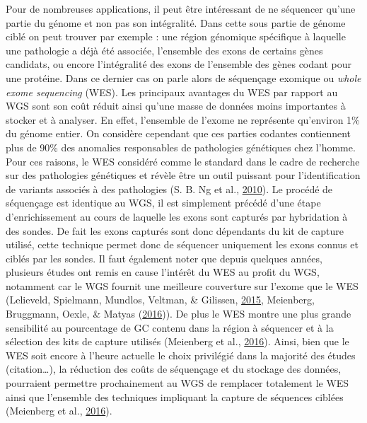 \documentclass[12pt,twoside]{reedthesis}
\theoremstyle{definition}
\theoremstyle{definition}
\theoremstyle{remark}
\begin{document}
  Pour de nombreuses applications, il peut être intéressant de ne
  séquencer qu'une partie du génome et non pas son intégralité. Dans cette
  sous partie de génome ciblé on peut trouver par exemple : une région
  génomique spécifique à laquelle une pathologie a déjà été associée,
  l'ensemble des exons de certains gènes candidats, ou encore
  l'intégralité des exons de l'ensemble des gènes codant pour une
  protéine. Dans ce dernier cas on parle alors de séquençage exomique ou
  \emph{whole exome sequencing} (WES). Les principaux avantages du WES par
  rapport au WGS sont son coût réduit ainsi qu'une masse de données moins
  importantes à stocker et à analyser. En effet, l'ensemble de l'exome ne
  représente qu'environ 1\% du génome entier. On considère cependant que
  ces parties codantes contiennent plus de 90\% des anomalies responsables
  de pathologies génétiques chez l'homme. Pour ces raisons, le WES
  considéré comme le standard dans le cadre de recherche sur des
  pathologies génétiques et révèle être un outil puissant pour
  l'identification de variants associés à des pathologies (S. B. Ng et
  al., \protect\hyperlink{ref-Ng2010}{2010}). Le procédé de séquençage est
  identique au WGS, il est simplement précédé d'une étape d'enrichissement
  au cours de laquelle les exons sont capturés par hybridation à des
  sondes. De fait les exons capturés sont donc dépendants du kit de
  capture utilisé, cette technique permet donc de séquencer uniquement les
  exons connus et ciblés par les sondes. Il faut également noter que
  depuis quelques années, plusieurs études ont remis en cause l'intérêt du
  WES au profit du WGS, notamment car le WGS fournit une meilleure
  couverture sur l'exome que le WES (Lelieveld, Spielmann, Mundlos,
  Veltman, \& Gilissen, \protect\hyperlink{ref-Lelieveld2015}{2015},
  Meienberg, Bruggmann, Oexle, \& Matyas
  (\protect\hyperlink{ref-Meienberg2016}{2016})). De plus le WES montre
  une plus grande sensibilité au pourcentage de GC contenu dans la région
  à séquencer et à la sélection des kits de capture utilisés (Meienberg et
  al., \protect\hyperlink{ref-Meienberg2016}{2016}). Ainsi, bien que le
  WES soit encore à l'heure actuelle le choix privilégié dans la majorité
  des études (citation\ldots{}), la réduction des coûts de séquençage et
  du stockage des données, pourraient permettre prochainement au WGS de
  remplacer totalement le WES ainsi que l'ensemble des techniques
  impliquant la capture de séquences ciblées (Meienberg et al.,
  \protect\hyperlink{ref-Meienberg2016}{2016}).
  
\end{document}
